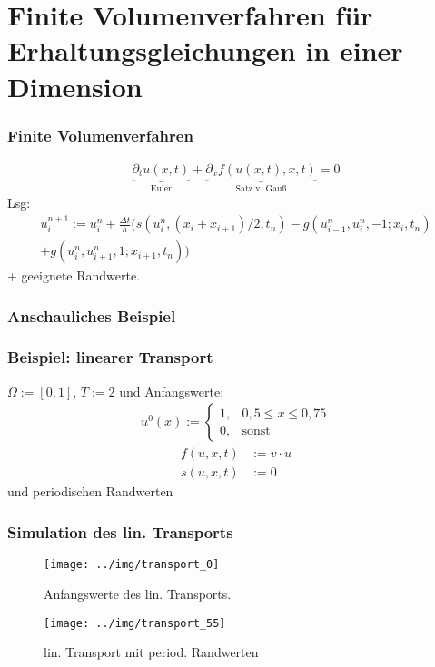 \section{Finite Volumenverfahren für Erhaltungsgleichungen in einer Dimension}
\begin{frame}
\frametitle{Finite Volumenverfahren}
\begin{align}
\underbrace{\partial _t u(x,t)}_{\text{Euler}} + \underbrace{\partial _xf(u(x,t),x,t)}_{\text{Satz v. Gauß}} = 0
\end{align}
Lsg:
\begin{align}
u_i^{n+1}:=u_i^n+\frac{\Delta t}{h} (s(u_i^n,(x_i+x_{i+1})/2,t_n)-g(u_{i-1}^n,u_i^n,-1;x_i,t_n)\nonumber \\
+g(u_i^n,u_{i+1}^n,1;x_{i+1},t_n))
\end{align}
+ geeignete Randwerte.
\end{frame}
\begin{frame}
\frametitle{Anschauliches Beispiel}
\begin{figure}

\end{figure}
\end{frame}
\begin{frame}
\frametitle{Beispiel: linearer Transport}
$\Omega:=\left[0, 1\right]$, $T:=2$ und Anfangswerte:
\begin{align}
u^0(x):=\left\{\begin{array}{ll} 1, & 0{,}5\leq x \leq 0{,}75 \\
0, & \text{sonst}\end{array}\right.
\end{align}
\begin{align}
f(u,x,t)&:=v\cdot u\\
s(u,x,t)&:=0
\end{align}
und periodischen Randwerten
\end{frame}
\begin{frame}
\frametitle{Simulation des lin. Transports}
\begin{minipage}[t]{0.48\linewidth}
\begin{figure}
\centering
\texttt{[image: ../img/transport\_0]}
\caption{Anfangswerte des lin. Transports.}
\label{fig:transport_0}
\end{figure}
\end{minipage}
\begin{minipage}[t]{0.5\linewidth}
\begin{figure}
\centering
\texttt{[image: ../img/transport\_55]}
\caption{lin. Transport mit period. Randwerten}
\label{fig:transport_55}
\end{figure}

\end{minipage}
\end{frame}
